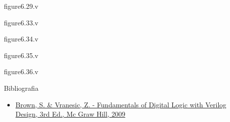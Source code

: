 

\subtitle{Circuitos Sequenciais: Máquinas de Estados Finitos} %



\begin{frame}
	\titlepage
\end{frame} 

\begin{frame}[fragile]{figure6.29.v}
\end{frame} 

\begin{frame}[fragile]{figure6.33.v}
\end{frame} 

\begin{frame}[fragile]{figure6.34.v}
\end{frame} 

\begin{frame}[fragile]{figure6.35.v}
\end{frame} 

\begin{frame}[fragile]{figure6.36.v}
\end{frame} 

\begin{frame}{Bibliografia} 
	\begin{itemize}
		\item \href{https://www.google.com.br/search?q=filetype\%3Apdf+Fundamentals+of+Digital+Logic+with+Verilog+Design+&oq=filetype\%3Apdf}{Brown, S. \& Vranesic, Z. - Fundamentals of Digital Logic with Verilog Design, 3rd Ed., Mc Graw Hill, 2009}
	\end{itemize}
\end{frame}

\begin{frame}
	\titlepage
\end{frame} 

